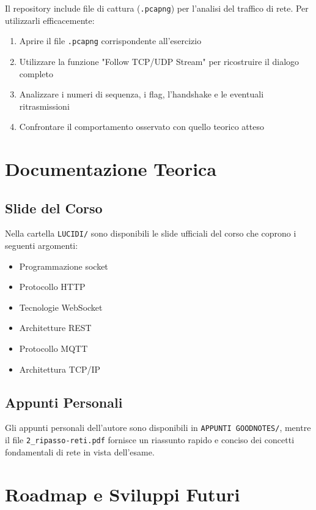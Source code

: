 \documentclass[12pt,a4paper]{article}
\begin{document}
Il repository include file di cattura (\texttt{.pcapng}) per l'analisi del traffico di rete. Per utilizzarli efficacemente:

\begin{enumerate}
    \item Aprire il file \texttt{.pcapng} corrispondente all'esercizio
    \item Utilizzare la funzione "Follow TCP/UDP Stream" per ricostruire il dialogo completo
    \item Analizzare i numeri di sequenza, i flag, l'handshake e le eventuali ritrasmissioni
    \item Confrontare il comportamento osservato con quello teorico atteso
\end{enumerate}

\section{Documentazione Teorica}

\subsection{Slide del Corso}
Nella cartella \texttt{LUCIDI/} sono disponibili le slide ufficiali del corso che coprono i seguenti argomenti:
\begin{itemize}
    \item Programmazione socket
    \item Protocollo HTTP
    \item Tecnologie WebSocket
    \item Architetture REST
    \item Protocollo MQTT
    \item Architettura TCP/IP
\end{itemize}

\subsection{Appunti Personali}
Gli appunti personali dell'autore sono disponibili in \texttt{APPUNTI GOODNOTES/}, mentre il file \texttt{2\_ripasso-reti.pdf} fornisce un riassunto rapido e conciso dei concetti fondamentali di rete in vista dell'esame.

\section{Roadmap e Sviluppi Futuri}
\end{document}
